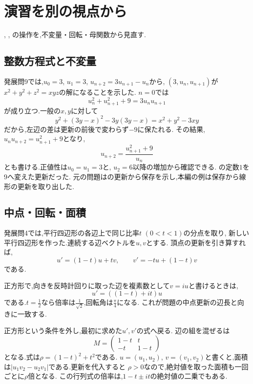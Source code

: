 \section{演習を別の視点から}\label{節：演習の操作を別の表現で見直す}
  ,
  ,
  の操作を,不変量・回転・母関数から見直す.

  \subsection{整数方程式と不変量}
  発展問9では,$u_0=3$, $u_1=3$, $u_{n+2}=3u_{n+1}-u_n$から,
  $(3,u_n,u_{n+1})$が$x^2+y^2+z^2=xyz$の解になることを示した.
  $n=0$では
  \[
    u_n^2+u_{n+1}^2+9=3u_nu_{n+1}
  \]
  が成り立つ.一般の$x,y$に対して
  \[
    y^2+(3y-x)^2-3y(3y-x)=x^2+y^2-3xy
  \]
  だから,左辺の差は更新の前後で変わらず$-9$に保たれる.
  その結果,$u_nu_{n+2}=u_{n+1}^2+9$となり,
  \[
    u_{n+2}=\frac{u_{n+1}^2+9}{u_n}
  \]
  とも書ける.正値性は$u_0=u_1=3$と,
  $u_2=6$以降の増加から確認できる.
  の定数$1$を$9$へ変えた更新だった.
  元の問題はの更新から保存を示し,本編の例は保存から線形の更新を取り出した.

  \subsection{中点・回転・面積}
  発展問4では,平行四辺形の各辺上で同じ比率$t$ $(0<t<1)$の分点を取り,
  新しい平行四辺形を作った.連続する辺ベクトルを$u,v$とする.
  頂点の更新を引き算すれば,
  \[
    u'=(1-t)u+tv,\qquad v'=-tu+(1-t)v
  \]
  である.

  正方形で,向きを反時計回りに取った辺を複素数として$v=iu$と書けるときは,
  \[
    u'=((1-t)+it)u
  \]
  である.$t=\frac12$なら倍率は$\frac1{\sqrt2}$,回転角は$\frac\pi4$になる.
  これが問題の中点更新の辺長と向きに一致する.

  正方形という条件を外し,最初に求めた$u',v'$の式へ戻る.
  辺の組を混ぜるは
  \[
    M=\begin{pmatrix}1-t&t\\-t&1-t\end{pmatrix}
  \]
  となる.式は$\rho=(1-t)^2+t^2$である.
  $u=(u_1,u_2)$, $v=(v_1,v_2)$と書くと,面積は$|u_1v_2-u_2v_1|$である.更新を代入すると
  \BookMathLayout{\[
    u'_1v'_2-u'_2v'_1
    =\bigl((1-t)^2+t^2\bigr)(u_1v_2-u_2v_1).
  \]}{\[
    \begin{aligned}
      u'_1v'_2-u'_2v'_1\\
      {}=\bigl((1-t)^2+t^2\bigr)(u_1v_2-u_2v_1).
    \end{aligned}
  \]}
  $\rho>0$なので,絶対値を取った面積も一回ごとに$\rho$倍となる.
  この行列式の倍率は,$1-t\pm it$の絶対値の二乗でもある.

